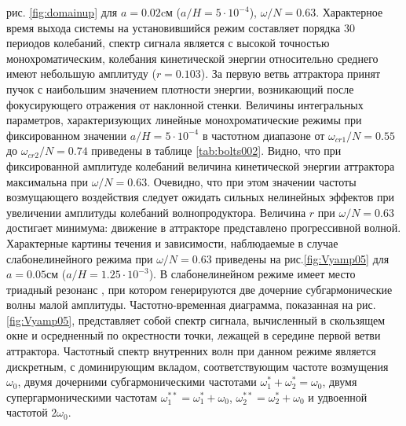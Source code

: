 рис. \ref{fig:domainup}
для  $a=0.02$cм ($a/H=5\cdot 10^{-4}$), $\omega/N=0.63$. Характерное время выхода системы на установившийся режим составляет порядка $30$ периодов колебаний, спектр сигнала является с высокой точностью монохроматическим, колебания кинетической энергии относительно среднего имеют небольшую амплитуду ($r=0.103$). За первую ветвь аттрактора принят пучок с наибольшим значением плотности энергии, возникающий после фокусирующего отражения от наклонной стенки. Величины интегральных параметров, характеризующих линейные монохроматические режимы при фиксированном значении $a/H=5\cdot 10^{-4}$ в частотном диапазоне от $\omega_{cr1}/N=0.55$ до $\omega_{cr2}/N=0.74$ приведены в таблице \ref{tab:bolts002}. Видно, что при фиксированной амплитуде колебаний величина кинетической энергии аттрактора максимальна при $\omega/N=0.63$. Очевидно, что при этом значении частоты возмущающего воздействия следует ожидать сильных нелинейных эффектов при увеличении амплитуды колебаний волнопродуктора. Величина $r$ при $\omega/N=0.63$ достигает минимума: движение в аттракторе представлено прогрессивной волной.  Характерные картины течения и зависимости, наблюдаемые в случае слабонелинейного режима при $\omega/N=0.63$ приведены на рис.\ref{fig:Vyamp05} для $a=0.05$см ($a/H=1.25\cdot 10^{-3}$). В слабонелинейном режиме имеет место триадный резонанс \cite{Dauxoisetal2018}, при котором генерируются две дочерние субгармонические волны малой амплитуды.  Частотно-временная диаграмма, показанная на рис. \ref{fig:Vyamp05}, представляет собой спектр сигнала, вычисленный в скользящем окне и осредненный по окрестности точки, лежащей в середине первой ветви аттрактора. Частотный спектр внутренних волн при данном режиме является дискретным, с доминирующим вкладом, соответствующим частоте возмущения $\omega_{0}$, двумя дочерними субгармоническими частотами $\omega_{1}^{*}+\omega_{2}^{*}=\omega_{0}$, двумя супергармоническими частотам $\omega_{1}^{**}=\omega_{1}^{*}+\omega_{0}$, $\omega_{2}^{**}=\omega_{2}^{*}+\omega_{0}$ и удвоенной частотой $2\omega_{0}$. 


